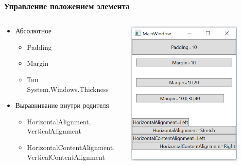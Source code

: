 \documentclass[xetex,mathserif,serif]{beamer}
\begin{document}
    \begin{frame}
        \frametitle{Управление положением элемента}
        \begin{columns}
            \begin{column}{0.7\textwidth}
                \begin{itemize}
                    \item Абсолютное
                    \begin{itemize}
                        \item Padding
                        \item Margin
                        \item Тип System.Windows.Thickness
                    \end{itemize}
                    \item Выравнивание внутри родителя
                    \begin{itemize}
                        \item HorizontalAlignment, VerticalAlignment
                        \item HorizontalContentAlignment, VerticalContentAlignment
                    \end{itemize}
                \end{itemize}
            \end{column}
            \begin{column}{0.3\textwidth}
                \begin{center}
                    \includegraphics[width=0.9\textwidth]{geometryTest.png}
                \end{center}
            \end{column}
        \end{columns}
    \end{frame}
\end{document}

